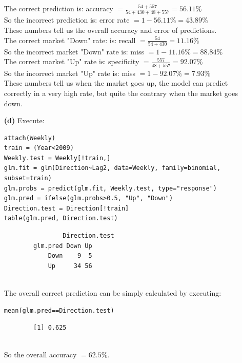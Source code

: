 \documentclass[twoside,11pt]{homework}
\begin{document}
\begin{enumerate}
\begin{verbatim}
		\end{verbatim}
		
		The correct prediction is: accuracy $=\frac{54+557}{54+430+48+557} = 56.11\%$\\
		So the incorrect prediction is: error rate $=1-56.11\%=43.89\%$\\
		These numbers tell us the overall accuracy and error of predictions.\\
		
		The correct market "Down" rate: is: recall $=\frac{54}{54+430}=11.16\%$\\
		So the incorrect market "Down" rate is: miss $=1-11.16\%=88.84\%$\\
		The correct market "Up" rate is: specificity $=\frac{557}{48+557}=92.07\%$\\
		So the incorrect market "Up" rate is: miss $=1-92.07\%=7.93\%$\\
		These numbers tell us when the market goes up, the model can predict correctly in a very high rate, but  quite the contrary when the market goes down.
		
		\item[\textbf{(d)}] Execute:
		
		\begin{lstlisting}
attach(Weekly)
train = (Year<2009)
Weekly.test = Weekly[!train,]
glm.fit = glm(Direction~Lag2, data=Weekly, family=binomial, subset=train)
glm.probs = predict(glm.fit, Weekly.test, type="response")
glm.pred = ifelse(glm.probs>0.5, "Up", "Down")
Direction.test = Direction[!train]
table(glm.pred, Direction.test)
		\end{lstlisting}
		
		\begin{verbatim}
		        Direction.test
		glm.pred Down Up
		    Down    9  5
		    Up     34 56
		    
		\end{verbatim}
		
		The overall correct prediction can be simply calculated by executing:
		
		\begin{lstlisting}
mean(glm.pred==Direction.test)
		\end{lstlisting}
		
		\begin{verbatim}
		[1] 0.625
		
		\end{verbatim}
		
		So the overall accuracy $=62.5\%$.
		

\end{enumerate}
\end{document}
